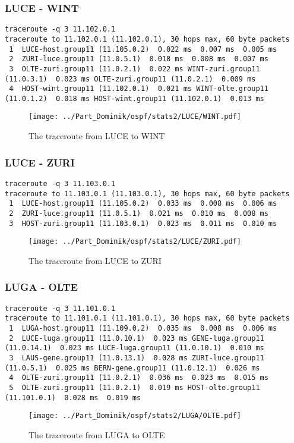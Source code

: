 \subsubsection{LUCE - WINT}
\begin{lstlisting}
traceroute -q 3 11.102.0.1
traceroute to 11.102.0.1 (11.102.0.1), 30 hops max, 60 byte packets
 1  LUCE-host.group11 (11.105.0.2)  0.022 ms  0.007 ms  0.005 ms
 2  ZURI-luce.group11 (11.0.5.1)  0.018 ms  0.008 ms  0.007 ms
 3  OLTE-zuri.group11 (11.0.2.1)  0.022 ms WINT-zuri.group11 (11.0.3.1)  0.023 ms OLTE-zuri.group11 (11.0.2.1)  0.009 ms
 4  HOST-wint.group11 (11.102.0.1)  0.021 ms WINT-olte.group11 (11.0.1.2)  0.018 ms HOST-wint.group11 (11.102.0.1)  0.013 ms
\end{lstlisting}
\begin{figure}[H]
\centering
\texttt{[image: ../Part\_Dominik/ospf/stats2/LUCE/WINT.pdf]}
\caption{The traceroute from LUCE to WINT}
\end{figure}
\clearpage
\subsubsection{LUCE - ZURI}
\begin{lstlisting}
traceroute -q 3 11.103.0.1
traceroute to 11.103.0.1 (11.103.0.1), 30 hops max, 60 byte packets
 1  LUCE-host.group11 (11.105.0.2)  0.033 ms  0.008 ms  0.006 ms
 2  ZURI-luce.group11 (11.0.5.1)  0.021 ms  0.010 ms  0.008 ms
 3  HOST-zuri.group11 (11.103.0.1)  0.023 ms  0.011 ms  0.010 ms
\end{lstlisting}
\begin{figure}[H]
\centering
\texttt{[image: ../Part\_Dominik/ospf/stats2/LUCE/ZURI.pdf]}
\caption{The traceroute from LUCE to ZURI}
\end{figure}
\clearpage
\subsubsection{LUGA - OLTE}
\begin{lstlisting}
traceroute -q 3 11.101.0.1
traceroute to 11.101.0.1 (11.101.0.1), 30 hops max, 60 byte packets
 1  LUGA-host.group11 (11.109.0.2)  0.035 ms  0.008 ms  0.006 ms
 2  LUCE-luga.group11 (11.0.10.1)  0.023 ms GENE-luga.group11 (11.0.14.1)  0.023 ms LUCE-luga.group11 (11.0.10.1)  0.010 ms
 3  LAUS-gene.group11 (11.0.13.1)  0.028 ms ZURI-luce.group11 (11.0.5.1)  0.025 ms BERN-gene.group11 (11.0.12.1)  0.026 ms
 4  OLTE-zuri.group11 (11.0.2.1)  0.036 ms  0.023 ms  0.015 ms
 5  OLTE-zuri.group11 (11.0.2.1)  0.019 ms HOST-olte.group11 (11.101.0.1)  0.028 ms  0.019 ms
\end{lstlisting}
\begin{figure}[H]
\centering
\texttt{[image: ../Part\_Dominik/ospf/stats2/LUGA/OLTE.pdf]}
\caption{The traceroute from LUGA to OLTE}
\end{figure}
\clearpage
